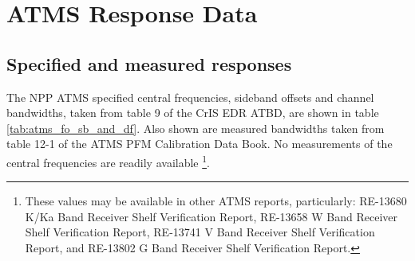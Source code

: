 \section{ATMS Response Data}

\subsection{Specified and measured responses}
The NPP ATMS specified central frequencies, sideband offsets and channel bandwidths, taken from table 9 of the CrIS EDR ATBD\cite{CrIS_EDR_ATBD}, are shown in table \ref{tab:atms_fo_sb_and_df}. Also shown are measured bandwidths taken from table 12-1 of the ATMS PFM Calibration Data Book\cite{ATMS_PFM_CalLog}. No measurements of the central frequencies are readily available \footnote{These values may be available in other ATMS reports, particularly: RE-13680 K/Ka Band Receiver Shelf Verification Report, RE-13658 W Band Receiver Shelf Verification Report, RE-13741 V Band Receiver Shelf Verification Report, and RE-13802 G Band Receiver Shelf Verification Report.}.

